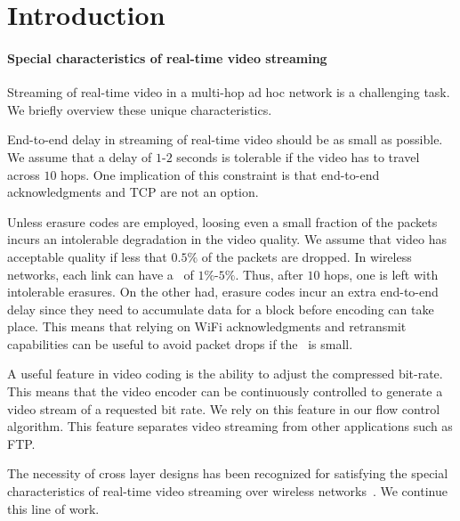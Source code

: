 \documentclass[12pt]{article}
\newenvironment{proof sketch}[1]{\noindent {\emph{Proof sketch of #1:}}}{\hfill \qed}
\newcommand{\PER}{\text{\sc{per}}}
\begin{document}
\section{Introduction}

\paragraph{Special characteristics of real-time video streaming}
Streaming of real-time video in a multi-hop ad hoc network is a
challenging task.  We briefly overview these unique characteristics.
\begin{inparaenum}[(1)]
\item End-to-end delay in streaming of real-time video should be as
  small as possible.  We assume that a delay of $1$-$2$ seconds is
  tolerable if the video has to travel across $10$ hops.  One
  implication of this constraint is that end-to-end acknowledgments and TCP are
  not an option.
\item Unless erasure codes are employed, loosing even a small fraction
  of the packets incurs an intolerable degradation in the video
  quality. We assume that video has acceptable quality if less that
  $0.5\%$ of the packets are dropped. In wireless networks, each link
  can have a \PER\ of $1\%$-$5\%$. Thus, after $10$ hops, one is left
  with intolerable erasures.  On the other had, erasure codes incur an
  extra end-to-end delay since they need to accumulate data for a
  block before encoding can take place. This means that relying on
  WiFi acknowledgments and retransmit capabilities can be useful to
  avoid packet drops if the \PER\ is small.
\item A useful feature in video coding is the ability to adjust the
  compressed bit-rate. This means that the video encoder can be
  continuously controlled to generate a video stream of a requested
  bit rate. We rely on this feature in our flow control algorithm.
  This feature separates video streaming from other applications such
  as FTP.
\end{inparaenum}
The necessity of cross layer designs has been recognized for
satisfying the special characteristics of real-time video streaming
over wireless
networks~\cite{shan2005cross,setton2005cross,khan2006application}.  We
continue this line of work.
\end{document}
